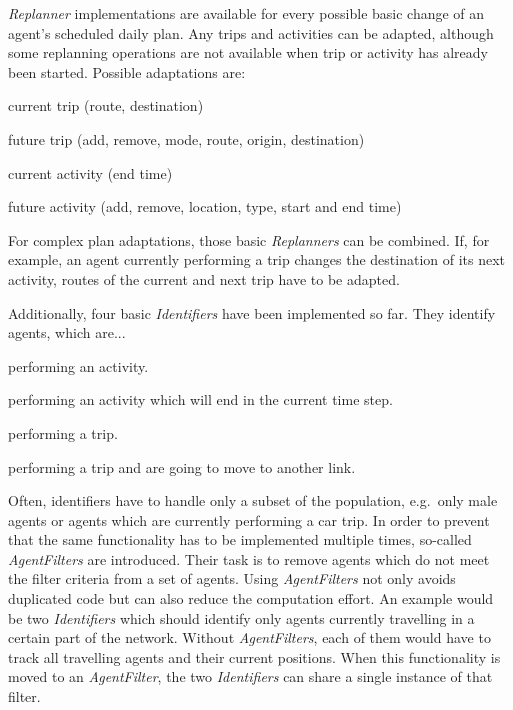 \emph{Replanner} implementations are available for every possible basic change of an agent's scheduled daily plan. Any trips and activities can be adapted, although some replanning operations are not available when trip or activity has already been started. Possible adaptations are:
\begin{compactitem}
    \item current trip (route, destination)
    \item future trip (add, remove, mode, route, origin, destination)
    \item current activity (end time)
    \item future activity (add, remove, location, type, start and end time)
\end{compactitem}

For complex plan adaptations, those basic \emph{Replanners} can be combined. If, for example, an agent currently performing a trip changes the destination of its next activity, routes of the current and next trip have to be adapted.

Additionally, four basic \emph{Identifiers} have been implemented so far. They identify agents, which are...
\begin{compactitem}
    \item performing an activity.
    \item performing an activity which will end in the current time step.
    \item performing a trip.
    \item performing a trip and are going to move to another link.
\end{compactitem}

Often, identifiers have to handle only a subset of the population, e.g.~only male agents or agents which are currently performing a car trip. In order to prevent that the same functionality has to be implemented multiple times, so-called \textit{AgentFilters} are introduced. Their task is to remove agents which do not meet the filter criteria from a set of agents. Using \textit{AgentFilters} not only avoids duplicated code but can also reduce the computation effort. An example would be two \textit{Identifiers} which should identify only agents currently travelling in a certain part of the network. Without \textit{AgentFilters}, each of them would have to track all travelling agents and their current positions. When this functionality is moved to an \textit{AgentFilter}, the two \textit{Identifiers} can share a single instance of that filter.

